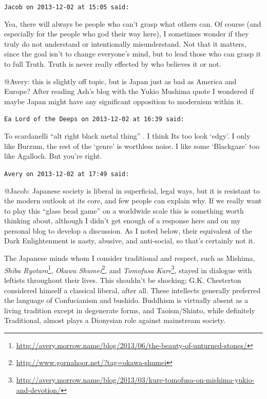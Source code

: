 \begin{footnotesize}
\begin{sffamily}
\hfill

\texttt{Jacob on 2013-12-02 at 15:05 said:}

Yea, there will always be people who can't grasp what others can. Of course (and especially for the people who god their way here), I sometimes wonder if they truly do not understand or intentionally misunderstand. Not that it matters, since the goal isn't to change everyone's mind, but to lead those who can grasp it to full Truth. Truth is never really effected by who believes it or not.

@Avery: this is slightly off topic, but is Japan just as bad as America and Europe? After reading Ash's blog with the Yukio Mushima quote I wondered if maybe Japan might have any significant opposition to modernism within it.

\hfill

\texttt{Ea Lord of the Deeps on 2013-12-02 at 16:39 said:}

To scardanelli ``alt right black metal thing'' . I think Its too look `edgy'. I only like Burzum, the rest of the `genre' is worthless noise. I like some `Blackgaze' too like Agalloch. But you're right.

\hfill

\texttt{Avery on 2013-12-02 at 17:49 said:}

@Jacob: Japanese society is liberal in superficial, legal ways, but it is resistant to the modern outlook at its core, and few people can explain why. If we really want to play this ``glass bead game'' on a worldwide scale this is something worth thinking about, although I didn't get enough of a response here and on my personal blog to develop a discussion. As I noted below, their equivalent of the Dark Enlightenment is nasty, abusive, and anti-social, so that's certainly not it.

The Japanese minds whom I consider traditional and respect, such as Mishima, \textit{Shiba Ryotaro}\footnote{\url{http://avery.morrow.name/blog/2013/06/the-beauty-of-unturned-stones/}}, \textit{Okawa Shumei}\footnote{\url{http://www.gornahoor.net/?tag=okawa-shumei}}, and \textit{Tomofusa Kure}\footnote{\url{http://avery.morrow.name/blog/2013/03/kure-tomofusa-on-mishima-yukio-and-devotion/}}, stayed in dialogue with leftists throughout their lives. This shouldn't be shocking; G.K. Chesterton considered himself a classical liberal, after all. These intellects generally preferred the language of Confucianism and bushido. Buddhism is virtually absent as a living tradition except in degenerate forms, and Taoism/Shinto, while definitely Traditional, almost plays a Dionysian role against mainstream society.


\end{sffamily}
\end{footnotesize}
